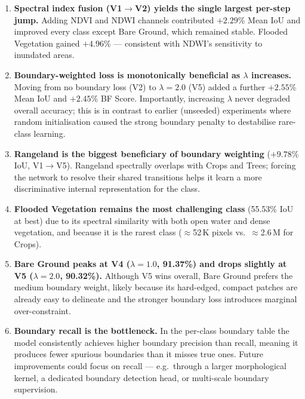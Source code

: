 \documentclass[12pt,a4paper]{article}
\begin{document}
\begin{enumerate}[leftmargin=*, label=\textbf{\arabic*.}]

  \item \textbf{Spectral index fusion (V1$\to$V2) yields the single largest
        per-step jump.}
        Adding NDVI and NDWI channels contributed $+2.29$\% Mean IoU and
        improved every class except Bare Ground, which remained stable.
        Flooded Vegetation gained $+4.96$\% — consistent with NDWI's
        sensitivity to inundated areas.

  \item \textbf{Boundary-weighted loss is monotonically beneficial as
        $\lambda$ increases.}
        Moving from no boundary loss (V2) to $\lambda=2.0$ (V5) added a
        further $+2.55$\% Mean IoU and $+2.45$\% BF Score. Importantly,
        increasing $\lambda$ never degraded overall accuracy; this is in
        contrast to earlier (unseeded) experiments where random
        initialisation caused the strong boundary penalty to destabilise
        rare-class learning.

  \item \textbf{Rangeland is the biggest beneficiary of boundary
        weighting} ($+9.78$\% IoU, V1$\to$V5). Rangeland spectrally
        overlaps with Crops and Trees; forcing the network to resolve
        their shared transitions helps it learn a more discriminative
        internal representation for the class.

  \item \textbf{Flooded Vegetation remains the most challenging class}
        (55.53\% IoU at best) due to its spectral similarity with both
        open water and dense vegetation, and because it is the rarest
        class ($\approx$52\,K pixels vs.\ $\approx$2.6\,M for Crops).

  \item \textbf{Bare Ground peaks at V4 ($\lambda=1.0$, 91.37\%) and
        drops slightly at V5 ($\lambda=2.0$, 90.32\%).} Although V5 wins
        overall, Bare Ground prefers the medium boundary weight, likely
        because its hard-edged, compact patches are already easy to
        delineate and the stronger boundary loss introduces marginal
        over-constraint.

  \item \textbf{Boundary recall is the bottleneck.} In the per-class
        boundary table the model consistently achieves higher boundary
        precision than recall, meaning it produces fewer spurious
        boundaries than it misses true ones. Future improvements could
        focus on recall — e.g.\ through a larger morphological kernel,
        a dedicated boundary detection head, or multi-scale boundary
        supervision.


\end{enumerate}
\end{document}
